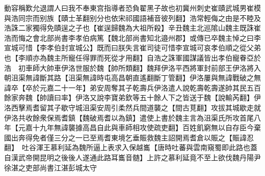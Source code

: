 動容稱歎允退謂人曰我不奉東宫指導者恐負翟黑子故也初冀州刺史崔賾武城男崔模與浩同宗而别族【賾士革翻别分也依宋祁國語補音彼列翻】浩常輕侮之由是不睦及浩誅二家獨得免賾逞之子也【崔逞歸魏為大祖所殺】辛丑魏主北巡隂山魏主既誅崔浩而悔之會北部尚書李孝伯病篤【魏北部尚書知北邉州郡】或傳已卒魏主悼之曰李宣城可惜【李孝伯封宣城公】既而曰朕失言崔司徒可惜李宣城可哀孝伯順之從父弟也【李順亦為魏主所寵任得罪而死從才用翻】自浩之誅軍國謀議皆出孝伯寵眷亞於浩　初車師大帥車伊洛世服於魏【帥所類翻】魏拜伊洛平西將軍封前部王伊洛將入朝沮渠無諱斷其路【沮渠無諱時屯高昌朝直遙翻斷丁管翻】伊洛屢與無諱戰破之無諱卒【卒於元嘉二十一年】弟安周奪其子乾壽兵伊洛遣人說乾壽乾壽遂帥其民五百餘家奔魏【帥讀曰率】伊洛又說李寶弟欽等五十餘人下之皆送于魏【說輸芮翻】伊洛西擊焉耆留其子歇守城沮渠安周引柔然兵間道襲之【間古莧翻】攻拔其城歇走就伊洛共收餘衆保焉耆鎮【魏破焉耆以為鎮】遣使上書於魏主言為沮渠氏所攻首尾八年【元嘉十九年無諱襲據高昌自此與車師相攻使疏吏翻】百姓飢窮無以自存臣今棄國出奔得免者僅三分之一已至焉耆東境乞垂賑救魏主詔開焉耆倉以賑之【賑諱忍翻】　吐谷渾王慕利延為魏所逼上表求入保越巂【唐時吐蕃與雲南窺蜀即此路也蓋自漢武帝開昆明之後後人遂通此路耳巂音髄】上許之慕利延竟不至上欲伐魏丹陽尹徐湛之吏部尚書江湛彭城太守

